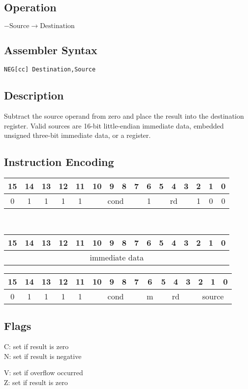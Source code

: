 \documentclass[11pt]{book}
\newcommand*{\encoding}[1]{\noindent
\begin{tabular}{|c|c|c|c|c|c|c|c|c|c|c|c|c|c|c|c|}
\multicolumn{1}{c}{15}&
\multicolumn{1}{c}{14}&
\multicolumn{1}{c}{13}&
\multicolumn{1}{c}{12}&
\multicolumn{1}{c}{11}&
\multicolumn{1}{c}{10}&
\multicolumn{1}{c}{9}&
\multicolumn{1}{c}{8}&
\multicolumn{1}{c}{7}&
\multicolumn{1}{c}{6}&
\multicolumn{1}{c}{5}&
\multicolumn{1}{c}{4}&
\multicolumn{1}{c}{3}&
\multicolumn{1}{c}{2}&
\multicolumn{1}{c}{1}&
\multicolumn{1}{c}{0}\\\hline
#1\\\hline
\end{tabular}}
\newcommand*{\instruction}[2][]{%
  \clearpage
  \thispagestyle{fancy}%
  \fancyhf[HL,HR]{\huge{#2}}%
  \fancyhf[HC]{#1}\addtocounter{section}{1}\noindent
}
\begin{document}

\instruction[Negate]{NEG}
\subsection*{Operation}
\(-\text{Source}\rightarrow\text{Destination}\)

\subsection*{Assembler Syntax}
\texttt{NEG[cc] Destination,Source}

\subsection*{Description}
Subtract the source operand from zero
and place the result into the destination register.
Valid sources are 16-bit little-endian immediate data,
embedded unsigned three-bit immediate data,
or a register.

\subsection*{Instruction Encoding}
\encoding{0&1&1&1&1%
&\multicolumn{4}{|c|}{cond}%
&1&\multicolumn{3}{|c|}{rd}&1&0&0}\\\null\qquad
\encoding{\multicolumn{16}{|c|}{immediate data}}

\vspace{2\baselineskip}
\encoding{0&1&1&1&1%
&\multicolumn{4}{|c|}{cond}%
&m&\multicolumn{3}{|c|}{rd}&\multicolumn{3}{|c|}{source}}

\subsection*{Flags}
\begin{multicols}{2}\noindent
  C: set if result is zero\\
  N: set if result is negative

  \columnbreak\noindent
  V: set if overflow occurred\\
  Z: set if result is zero
\end{multicols}
\end{document}
